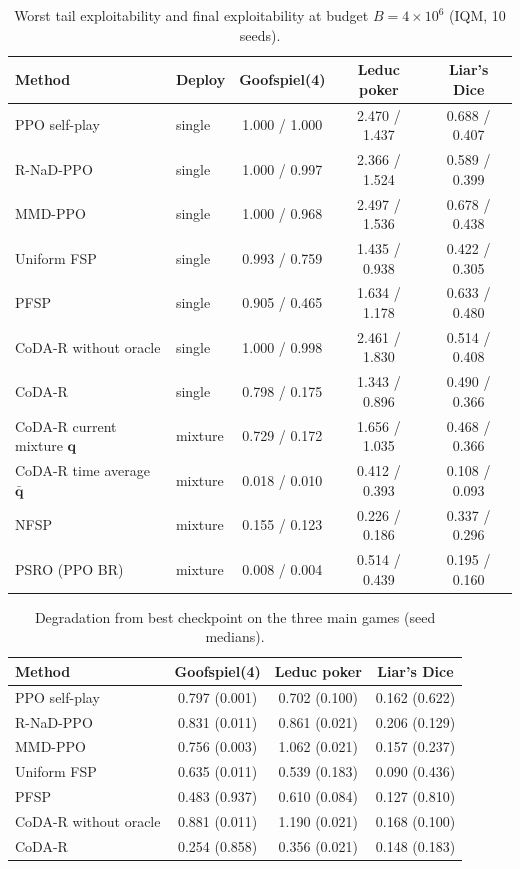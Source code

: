 \documentclass{article}
\theoremstyle{plain}
\theoremstyle{remark}
\newcommand{\bq}{{\bm{q}}}
\newcommand{\codar}{CoDA-R}
\newcommand{\rnad}{R-NaD-PPO}
\begin{document}
\begin{table}[!htbp]
\caption{Worst tail exploitability and final exploitability at budget $B=4\times10^6$ (IQM, 10 seeds).}
\label{tab:main-full}
\begin{center}
\footnotesize
\begin{tabular}{llccc}
\toprule
Method & Deploy & Goofspiel(4) & Leduc poker & Liar's Dice \\
\midrule
PPO self-play & single & 1.000 / 1.000 & 2.470 / 1.437 & 0.688 / 0.407 \\
\rnad{} & single & 1.000 / 0.997 & 2.366 / 1.524 & 0.589 / 0.399 \\
MMD-PPO & single & 1.000 / 0.968 & 2.497 / 1.536 & 0.678 / 0.438 \\
Uniform FSP & single & 0.993 / 0.759 & 1.435 / 0.938 & 0.422 / 0.305 \\
PFSP & single & 0.905 / 0.465 & 1.634 / 1.178 & 0.633 / 0.480 \\
\codar{} without oracle & single & 1.000 / 0.998 & 2.461 / 1.830 & 0.514 / 0.408 \\
\codar{} & single & 0.798 / 0.175 & 1.343 / 0.896 & 0.490 / 0.366 \\
\midrule
\codar{} current mixture $\bq$ & mixture & 0.729 / 0.172 & 1.656 / 1.035 & 0.468 / 0.366 \\
\codar{} time average $\bar{\bq}$ & mixture & 0.018 / 0.010 & 0.412 / 0.393 & 0.108 / 0.093 \\
NFSP & mixture & 0.155 / 0.123 & 0.226 / 0.186 & 0.337 / 0.296 \\
PSRO (PPO BR) & mixture & 0.008 / 0.004 & 0.514 / 0.439 & 0.195 / 0.160 \\
\bottomrule
\end{tabular}
\end{center}
\end{table}

\begin{table}[!htbp]
\caption{Degradation from best checkpoint on the three main games (seed medians).}
\label{tab:degradation}
\begin{center}
\footnotesize
\begin{tabular}{lccc}
\toprule
Method & Goofspiel(4) & Leduc poker & Liar's Dice \\
\midrule
PPO self-play & 0.797 (0.001) & 0.702 (0.100) & 0.162 (0.622) \\
\rnad{} & 0.831 (0.011) & 0.861 (0.021) & 0.206 (0.129) \\
MMD-PPO & 0.756 (0.003) & 1.062 (0.021) & 0.157 (0.237) \\
Uniform FSP & 0.635 (0.011) & 0.539 (0.183) & 0.090 (0.436) \\
PFSP & 0.483 (0.937) & 0.610 (0.084) & 0.127 (0.810) \\
\codar{} without oracle & 0.881 (0.011) & 1.190 (0.021) & 0.168 (0.100) \\
\codar{} & 0.254 (0.858) & 0.356 (0.021) & 0.148 (0.183) \\
\bottomrule
\end{tabular}
\end{center}
\end{table}
\end{document}
